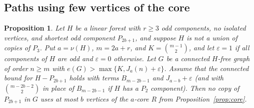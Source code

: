 \documentclass[10pt]{article}
\theoremstyle{compactplain}
\newtheorem{proposition}[theorem]{Proposition}
\theoremstyle{remark}\newtheorem{remark}[theorem]{Remark}
\begin{document}
\subsection{Paths using few vertices of the core}

\begin{proposition}\label{prop:no-low-core-path}
Let $H$ be a linear forest with $r\ge3$ odd components, no isolated
vertices, and shortest odd component $P_{2b+1}$, and suppose $H$ is not
a union of copies of $P_3$. Put $a=\nu(H)$, $m=2a+r$, and
$K=\binom{m-1}{2}$, and let $\varepsilon=1$ if all components of $H$ are
odd and $\varepsilon=0$ otherwise. Let $G$ be a connected $H$-free graph
of order $n\ge m$ with $e(G)>\max\{K,J_a(n)+\varepsilon\}$. Assume that
the connected bound for $H-P_{2b+1}$ holds with terms $B_{m-2b-1}$ and
$J_{a-b}+\varepsilon$ (and with $\binom{m-2b-2}{2}$ in place of
$B_{m-2b-1}$ if $H$ has a $P_2$ component). Then no copy of $P_{2b+1}$
in $G$ uses at most $b$ vertices of the $a$-core $R$ from
Proposition~\ref{prop:core}.
\end{proposition}
\end{document}
